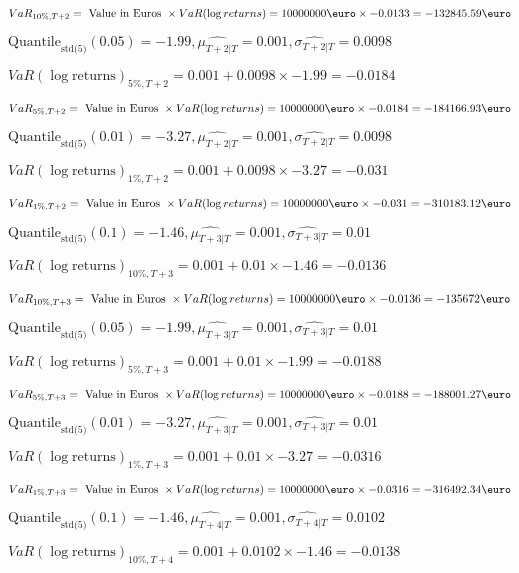 $VaR_{10\%, T + 2} = \text{ Value in Euros } \times VaR(\log returns) = 10 000 000 \text{\euro} \times-0.0133 = -132845.59 \text{\euro}$


$\text{Quantile}_\text{std(5)}(0.05) = -1.99,\hat{\mu_{T+2|T}} = 0.001, \hat{\sigma_{T+2|T}} = 0.0098$

$VaR(\log \text{returns})_{5\%, T + 2} = 0.001 + 0.0098\times-1.99 = -0.0184$

$VaR_{5\%, T + 2} = \text{ Value in Euros } \times VaR(\log returns) = 10 000 000 \text{\euro} \times-0.0184 = -184166.93 \text{\euro}$


$\text{Quantile}_\text{std(5)}(0.01) = -3.27,\hat{\mu_{T+2|T}} = 0.001, \hat{\sigma_{T+2|T}} = 0.0098$

$VaR(\log \text{returns})_{1\%, T + 2} = 0.001 + 0.0098\times-3.27 = -0.031$

$VaR_{1\%, T + 2} = \text{ Value in Euros } \times VaR(\log returns) = 10 000 000 \text{\euro} \times-0.031 = -310183.12 \text{\euro}$


$\text{Quantile}_\text{std(5)}(0.1) = -1.46,\hat{\mu_{T+3|T}} = 0.001, \hat{\sigma_{T+3|T}} = 0.01$

$VaR(\log \text{returns})_{10\%, T + 3} = 0.001 + 0.01\times-1.46 = -0.0136$

$VaR_{10\%, T + 3} = \text{ Value in Euros } \times VaR(\log returns) = 10 000 000 \text{\euro} \times-0.0136 = -135672 \text{\euro}$


$\text{Quantile}_\text{std(5)}(0.05) = -1.99,\hat{\mu_{T+3|T}} = 0.001, \hat{\sigma_{T+3|T}} = 0.01$

$VaR(\log \text{returns})_{5\%, T + 3} = 0.001 + 0.01\times-1.99 = -0.0188$

$VaR_{5\%, T + 3} = \text{ Value in Euros } \times VaR(\log returns) = 10 000 000 \text{\euro} \times-0.0188 = -188001.27 \text{\euro}$


$\text{Quantile}_\text{std(5)}(0.01) = -3.27,\hat{\mu_{T+3|T}} = 0.001, \hat{\sigma_{T+3|T}} = 0.01$

$VaR(\log \text{returns})_{1\%, T + 3} = 0.001 + 0.01\times-3.27 = -0.0316$

$VaR_{1\%, T + 3} = \text{ Value in Euros } \times VaR(\log returns) = 10 000 000 \text{\euro} \times-0.0316 = -316492.34 \text{\euro}$


$\text{Quantile}_\text{std(5)}(0.1) = -1.46,\hat{\mu_{T+4|T}} = 0.001, \hat{\sigma_{T+4|T}} = 0.0102$

$VaR(\log \text{returns})_{10\%, T + 4} = 0.001 + 0.0102\times-1.46 = -0.0138$

